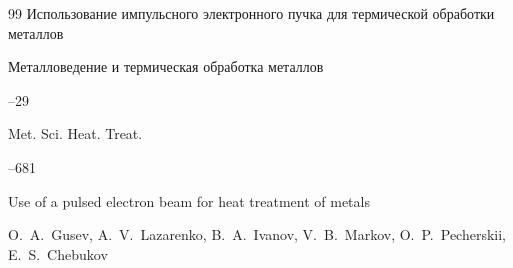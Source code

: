 \begin{thebibliography}{99}
\paper Использование импульсного электронного пучка для термической обработки металлов

\jour Металловедение и термическая обработка металлов



--29

\transl

\jour Met. Sci. Heat. Treat.




--681

\paper Use of a pulsed electron beam for heat treatment of metals

\by O.~A.~Gusev, A.~V.~Lazarenko, B.~A.~Ivanov, V.~B.~Markov, O.~P.~Pecherskii, E.~S.~Chebukov 




\end{thebibliography}



\renewcommand{\correctvfill}{\vspace{-10mm}}



\makeentitle



\newpage



%

